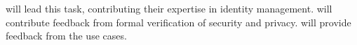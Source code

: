 \begin{Workpackage}{\thewpno}
\begin{Task}
\COGNIshort{} will lead this task, contributing their expertise in identity management. \USTANshort{} will contribute feedback from formal verification of security and privacy. \SOPRAshort{} will provide feedback from the use cases.

\end{Task}

\begin{Task}



\end{Task}
\end{Workpackage}
